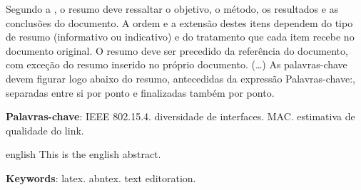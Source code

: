 \documentclass[
	12pt,				%
	openright,			%
	oneside,
	a4paper,			%
	english,			%
	french,				%
	spanish,			%
	brazil				%
	]{abntex2}
\begin{document}
%
%


\setlength{\absparsep}{18pt} %
\begin{resumo}
 
 
 Segundo a , o resumo deve ressaltar o
 objetivo, o método, os resultados e as conclusões do documento. A ordem e a extensão
 destes itens dependem do tipo de resumo (informativo ou indicativo) e do
 tratamento que cada item recebe no documento original. O resumo deve ser
 precedido da referência do documento, com exceção do resumo inserido no
 próprio documento. (\ldots) As palavras-chave devem figurar logo abaixo do
 resumo, antecedidas da expressão Palavras-chave:, separadas entre si por
 ponto e finalizadas também por ponto.

 \textbf{Palavras-chave}: IEEE 802.15.4. diversidade de interfaces. MAC. estimativa de qualidade do link.
\end{resumo}

\begin{resumo}[Abstract]
 \begin{otherlanguage*}{english}
   This is the english abstract.

   \vspace{\onelineskip}
 
   \noindent 
   \textbf{Keywords}: latex. abntex. text editoration.
 \end{otherlanguage*}
\end{resumo}
\end{document}
